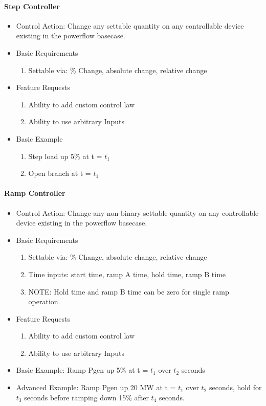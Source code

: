 \documentclass[12pt]{article}
\begin{document}
\begin{multicols}{2}
	
\paragraph{Step Controller}
\begin{itemize}
	\item Control Action: Change any settable quantity on any controllable device existing in the powerflow basecase.
	\item Basic Requirements
	\begin{enumerate}
		\item Settable via: \% Change, absolute change, relative change
	\end{enumerate}
	\item Feature Requests
	\begin{enumerate}
		\item Ability to add custom control law
		\item Ability to use arbitrary Inputs
	\end{enumerate}
	\item Basic Example 
	\begin{enumerate}
		\item Step load up 5\% at t = $t_1$
		\item Open branch at t = $t_1$
	\end{enumerate}
\end{itemize}

\paragraph{Ramp Controller}
\begin{itemize}
	\item Control Action: Change any non-binary settable quantity on any controllable device existing in the powerflow basecase.
	\item Basic Requirements
	\begin{enumerate}
		\item Settable via: \% Change, absolute change, relative change
		\item Time inputs: start time, ramp A time, hold time, ramp B time
		\item NOTE: Hold time and ramp B time can be zero for single ramp operation.
	\end{enumerate}
	\item Feature Requests
	\begin{enumerate}
		\item Ability to add custom control law
		\item Ability to use arbitrary Inputs
	\end{enumerate}
	\item Basic Example: Ramp Pgen up 5\% at t = $t_1$ over $t_2$ seconds
	\item Advanced Example: Ramp Pgen up 20 MW at t = $t_1$ over $t_2$ seconds, hold for $t_3$ seconds before ramping down 15\% after $t_4$ seconds.
\end{itemize}


\end{multicols}
\end{document}
